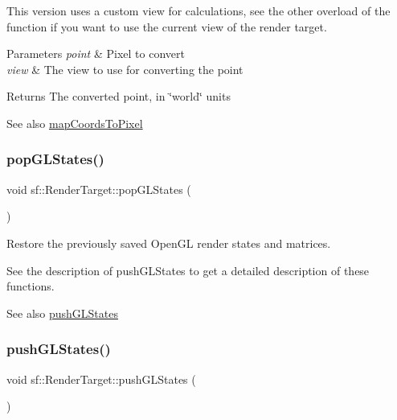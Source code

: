 This version uses a custom view for calculations, see the other overload of the function if you want to use the current view of the render target.


\begin{DoxyParams}{Parameters}
{\em point} & Pixel to convert \\
\hline
{\em view} & The view to use for converting the point\\
\hline
\end{DoxyParams}
\begin{DoxyReturn}{Returns}
The converted point, in \char`\"{}world\char`\"{} units
\end{DoxyReturn}
\begin{DoxySeeAlso}{See also}
\hyperlink{classsf_1_1_render_target_ad92a9f0283aa5f3f67e473c1105b68cf}{map\+Coords\+To\+Pixel} 
\end{DoxySeeAlso}
\mbox{\label{classsf_1_1_render_target_ad5a98401113df931ddcd54c080f7aa8e}} 
\subsubsection{\texorpdfstring{pop\+G\+L\+States()}{popGLStates()}}
{\footnotesize\ttfamily void sf\+::\+Render\+Target\+::pop\+G\+L\+States (\begin{DoxyParamCaption}{ }\end{DoxyParamCaption})}



Restore the previously saved Open\+GL render states and matrices. 

See the description of push\+G\+L\+States to get a detailed description of these functions.

\begin{DoxySeeAlso}{See also}
\hyperlink{classsf_1_1_render_target_a8d1998464ccc54e789aaf990242b47f7}{push\+G\+L\+States} 
\end{DoxySeeAlso}
\mbox{\label{classsf_1_1_render_target_a8d1998464ccc54e789aaf990242b47f7}} 
\subsubsection{\texorpdfstring{push\+G\+L\+States()}{pushGLStates()}}
{\footnotesize\ttfamily void sf\+::\+Render\+Target\+::push\+G\+L\+States (\begin{DoxyParamCaption}{ }\end{DoxyParamCaption})}



